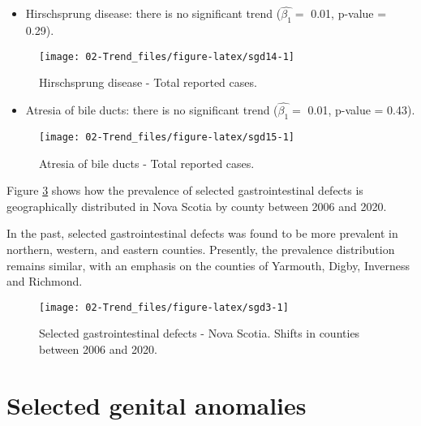 \documentclass[
]{krantz}
\providecommand{\tightlist}{%
  \setlength{\itemsep}{0pt}\setlength{\parskip}{0pt}}
\begin{document}
\begin{itemize}
\tightlist
\item
  Hirschsprung disease: there is no significant trend (\(\hat{\beta_{1}} =\) 0.01, p-value = 0.29).
\end{itemize}

\begin{figure}[h]

{\centering \texttt{[image: 02-Trend\_files/figure-latex/sgd14-1]} 

}

\caption{Hirschsprung disease - Total reported cases.}\label{fig:sgd14}
\end{figure}

\begin{itemize}
\tightlist
\item
  Atresia of bile ducts: there is no significant trend (\(\hat{\beta_{1}} =\) 0.01, p-value = 0.43).
\end{itemize}

\begin{figure}[h]

{\centering \texttt{[image: 02-Trend\_files/figure-latex/sgd15-1]} 

}

\caption{Atresia of bile ducts - Total reported cases.}\label{fig:sgd15}
\end{figure}

Figure \ref{fig:sgd3} shows how the prevalence of selected gastrointestinal defects is geographically distributed in Nova Scotia by county between 2006 and 2020.

In the past, selected gastrointestinal defects was found to be more prevalent in northern, western, and eastern counties. Presently, the prevalence distribution remains similar, with an emphasis on the counties of Yarmouth, Digby, Inverness and Richmond.

\begin{figure}[h]

{\centering \texttt{[image: 02-Trend\_files/figure-latex/sgd3-1]} 

}

\caption{Selected gastrointestinal defects - Nova Scotia. Shifts in counties between 2006 and 2020.}\label{fig:sgd3}
\end{figure}

\clearpage

\hypertarget{section38}{%
\section{Selected genital anomalies}\label{section38}}
\end{document}
